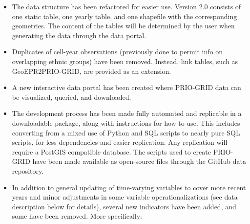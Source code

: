\documentclass[]{book}
\begin{document}
\begin{itemize}
\itemsep1pt\parskip0pt
\item
  The data structure has been refactored for easier use. Version 2.0
  consists of one static table, one yearly table, and one shapefile with
  the corresponding geometries. The content of the tables will be
  determined by the user when generating the data through the data
  portal.
\item
  Duplicates of cell-year observations (previously done to permit info
  on overlapping ethnic groups) have been removed. Instead, link tables,
  such as GeoEPR2PRIO-GRID, are provided as an extension.
\item
  A new interactive data portal has been created where PRIO-GRID data
  can be visualized, queried, and downloaded.
\item
  The development process has been made fully automated and replicable
  in a downloadable package, along with instructions for how to use.
  This includes converting from a mixed use of Python and SQL scripts to
  nearly pure SQL scripts, for less dependencies and easier replication.
  Any replication will require a PostGIS compatible database. The
  scripts used to create PRIO-GRID have been made available as
  open-source files through the GitHub data repository.
\item
  In addition to general updating of time-varying variables to cover
  more recent years and minor adjustments in some variable
  operationalizations (see data description below for details), several
  new indicators have been added, and some have been removed. More
  specifically:


\end{itemize}
\end{document}
